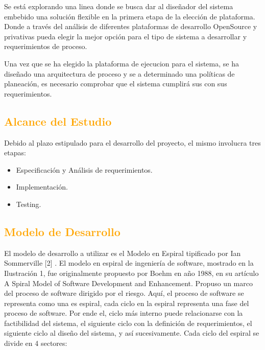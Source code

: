 \documentclass[a4paper,11pt]{article}
\begin{document}
Se está explorando una linea donde se busca dar al diseñador del sistema embebido una solución flexible en la primera etapa de la elección de plataforma. Donde a través del análisis de diferentes plataformas de desarrollo OpenSource y privativas pueda elegir la mejor opción para el tipo de sistema a desarrollar y requerimientos de proceso. 
 
Una vez que se ha elegido la plataforma de ejecucion para el sistema, se ha diseñado una arquitectura de proceso y se a determinado una políticas de planeación, es necesario comprobar que el sistema cumplirá sus con sus requerimientos.

\subsection{\textcolor{orange}{Alcance del Estudio}}

Debido al plazo estipulado para el desarrollo del proyecto, el mismo involucra tres etapas: 

 \begin {itemize}
\item Especificación y Análisis de requerimientos.
\item Implementación.
\item Testing.
 \end {itemize}


\subsection{\textcolor{orange}{Modelo de Desarrollo}}


El modelo de desarrollo a utilizar es el Modelo en Espiral tipificado por Ian Sommerville [2] . El modelo en espiral de ingeniería de software, mostrado en la Ilustración 1, fue originalmente propuesto por Boehm en año 1988, en su artículo A Spiral Model of Software Development and Enhancement. Propuso un marco del proceso de software dirigido por el riesgo. Aquí, el proceso de software se representa como una es espiral, cada ciclo en la espiral representa una fase del proceso de software. Por ende el, ciclo más interno puede relacionarse con la factibilidad del sistema, el siguiente ciclo con la definición de requerimientos, el siguiente ciclo al diseño del sistema, y así sucesivamente.
Cada ciclo del espiral se divide en 4 sectores:
 
\end{document}
